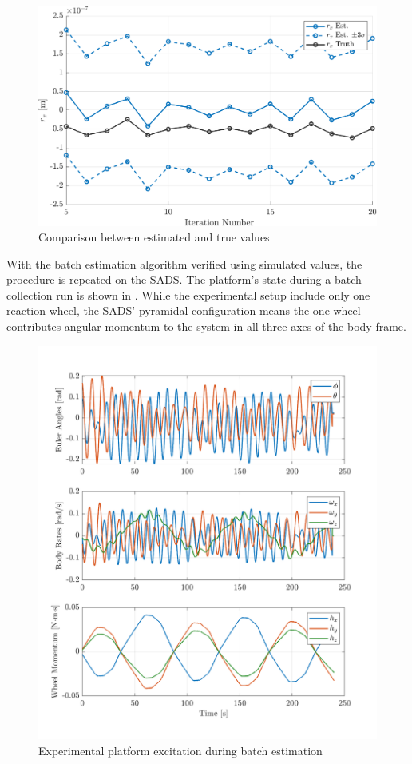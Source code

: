\begin{figure}[ht]
    \centering
    \includegraphics[width=\linewidth]{plots/LSR_sim_confidence.pdf}
    \caption{Comparison between estimated and true values}
    \label{fig:LSR_sim_confidence}
\end{figure}

With the batch estimation algorithm verified using simulated values, the procedure is repeated on the SADS. The platform's state during a batch collection run is shown in . While the experimental setup include only one reaction wheel, the SADS' pyramidal configuration means the one wheel contributes angular momentum to the system in all three axes of the body frame. 

\begin{figure}[ht]
    \centering
    \includegraphics[width=\linewidth]{plots/LSR_hardware_excitation.png}
    \caption{Experimental platform excitation during batch estimation}
    \label{fig:LSR_hardware_excitation}
\end{figure}

